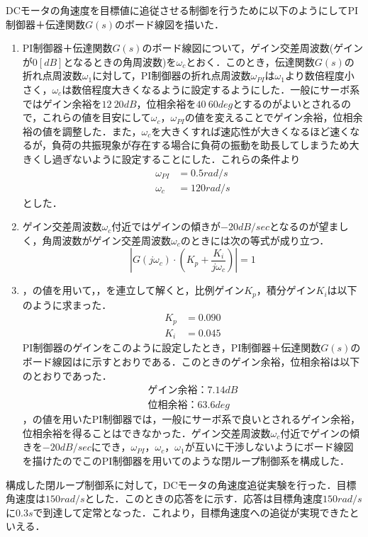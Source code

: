 \newpage

DCモータの角速度を目標値に追従させる制御を行うために以下のようにしてPI制御器＋伝達関数$G(s)$のボード線図を描いた．

\begin{enumerate}
\item PI制御器＋伝達関数$G(s)$のボード線図について，ゲイン交差周波数(ゲインが$0[dB]$となるときの角周波数)を$\omega_{c}$とおく．このとき，伝達関数$G(s)$の折れ点周波数$\omega_{1}$に対して，PI制御器の折れ点周波数$\omega_{PI}$は$\omega_{1}$より数倍程度小さく，$\omega_{c}$は数倍程度大きくなるように設定するようにした．一般にサーボ系ではゲイン余裕を$12~20\unit{dB}$，位相余裕を$40~60\unit{deg}$とするのがよいとされるので，これらの値を目安にして$\omega_{c}$，$\omega_{PI}$の値を変えることでゲイン余裕，位相余裕の値を調整した．また，$\omega_{c}$を大きくすれば速応性が大きくなるほど速くなるが，負荷の共振現象が存在する場合に負荷の振動を助長してしまうため大きくし過ぎないように設定することにした．これらの条件より
\begin{align}
 \omega_{PI}&=0.5\unit{rad/s}\label{eq::omega_PI_value}\\
 \omega_{c}&=120\unit{rad/s}\label{eq::omega_c_value}
\end{align}
とした．
\item ゲイン交差周波数$\omega_{c}$付近ではゲインの傾きが$-20\unit{dB/sec}$となるのが望ましく，角周波数がゲイン交差周波数$\omega_{c}$のときには次の等式が成り立つ．
\begin{equation}
|G(j\omega_{c})\cdot(K_{p}+\frac{K_{i}}{j\omega_{c}})|=1\label{eq::omega_c_1}
\end{equation}
\item {}，の値を用いて，，を連立して解くと，比例ゲイン$K_{p}$，積分ゲイン$K_{i}$は以下のように求まった．
\begin{align}
K_{p}&=0.090\label{eq::K_p_value}\\
K_{i}&=0.045\label{eq::K_i_value}
\end{align}
PI制御器のゲインをこのように設定したとき，PI制御器＋伝達関数$G(s)$のボード線図はに示すとおりである．このときのゲイン余裕，位相余裕は以下のとおりであった．
\begin{align}
ゲイン余裕：7.14\unit{dB}\\
位相余裕：63.6\unit{deg}
\end{align}
，の値を用いたPI制御器では，一般にサーボ系で良いとされるゲイン余裕，位相余裕を得ることはできなかった．ゲイン交差周波数$\omega_{c}$付近でゲインの傾きを$-20\unit{dB/sec}$にでき，$\omega_{PI}$，$\omega_{c}$，$\omega_{1}$が互いに干渉しないようにボード線図を描けたのでこのPI制御器を用いてのような閉ループ制御系を構成した．
\end{enumerate}
構成した閉ループ制御系に対して，DCモータの角速度追従実験を行った．目標角速度は$150\unit{rad/s}$とした．このときの応答をに示す．応答は目標角速度$150\unit{rad/s}$に$0.3\unit{s}$で到達して定常となった．これより，目標角速度への追従が実現できたといえる．

